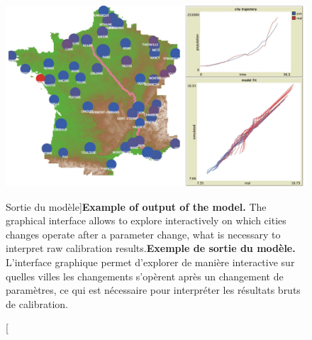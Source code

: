 \begin{figure}
\includegraphics[width=\linewidth]{Figures/Final/4-3-2-fig-interactiongibrat-interface}
\caption[Model output][Sortie du modèle]{\textbf{Example of output of the model.} The graphical interface allows to explore interactively on which cities changes operate after a parameter change, what is necessary to interpret raw calibration results.\label{fig:interactiongibrat:interface}}{\textbf{Exemple de sortie du modèle.} L'interface graphique permet d'explorer de manière interactive sur quelles villes les changements s'opèrent après un changement de paramètres, ce qui est nécessaire pour interpréter les résultats bruts de calibration.\label{fig:interactiongibrat:interface}}
\end{figure}



